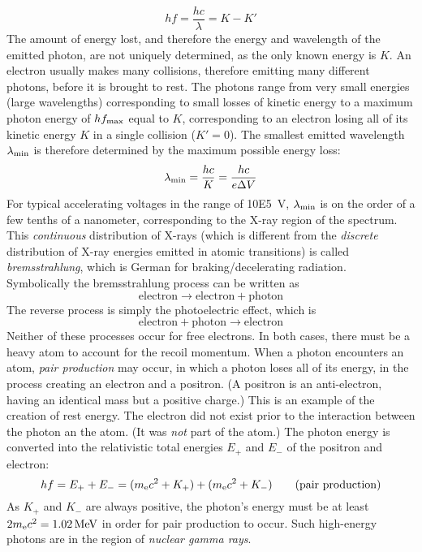 \documentclass{subfiles}
\begin{document}
				\[
					hf = \frac{hc}{\lambda}
						= K - K'
				\]
				The amount of energy lost, and therefore the energy and wavelength of the emitted photon, are not uniquely determined, as the only known energy is \(K\). An electron usually makes many collisions, therefore emitting many different photons, before it is brought to rest. The photons range from very small energies (large wavelengths) corresponding to small losses of kinetic energy to a maximum photon energy of \(hf_{\text{max}}\) equal to \(K\), corresponding to an electron losing all of its kinetic energy \(K\) in a single collision (\(K' = 0\)). The smallest emitted wavelength \(\lambda_{\text{min}}\) is therefore determined by the maximum possible energy loss:
				\[
					\lambda_{\text{min}} = \frac{hc}{K}
						= \frac{hc}{e\Delta V}
				\]
				For typical accelerating voltages in the range of \SI{10E5}{V}, \(\lambda_{\text{min}}\) is on the order of a few tenths of a nanometer, corresponding to the X-ray region of the spectrum. This \textit{continuous} distribution of X-rays (which is different from the \textit{discrete} distribution of X-ray energies emitted in atomic transitions) is called \textit{bremsstrahlung}, which is German for braking/decelerating radiation. \\
				Symbolically the bremsstrahlung process can be written as
				\[\mathrm{electron \to electron + photon} \tag{bremsstrahlung process}\]
				The reverse process is simply the photoelectric effect, which is
				\[\mathrm{electron + photon \to electron} \tag{photoelectric effect}\]
				Neither of these processes occur for free electrons. In both cases, there must be a heavy atom to account for the recoil momentum.
			When a photon encounters an atom, \textit{pair production} may occur, in which a photon loses all of its energy, in the process creating an electron and a positron. (A positron is an anti-electron, having an identical mass but a positive charge.) This is an example of the creation of rest energy. The electron did not exist prior to the interaction between the photon an the atom. (It was \textit{not} part of the atom.) The photon energy is converted into the relativistic total energies \(E_+\) and \(E_-\) of the positron and electron:
				\[
					hf = E_+ + E_-
						= (m_{\text{e}}c^2 + K_+) + (m_{\text{e}}c^2 + K_-)
						\tag{pair production}
				\]
				As \(K_+\) and \(K_-\) are always positive, the photon's energy must be at least \(2m_{\text{e}}c^2 = \SI{1.02}{MeV}\) in order for pair production to occur. Such high-energy photons are in the region of \textit{nuclear gamma rays}. \\
\end{document}
